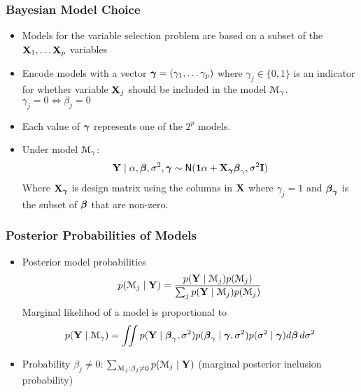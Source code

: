 \documentclass{beamer}\usepackage[]{graphicx}\usepackage[]{color}
\begin{document}
\begin{frame}\frametitle{Bayesian Model Choice}
  \begin{itemize}
  \item
Models for the variable selection problem  are based on a subset of
  the $\mathbf{X}_1, \ldots \mathbf{X}_p$ variables  \pause

\item Encode models with a  vector $\boldsymbol{\gamma} = (\gamma_1, \ldots
  \gamma_p)$  where  $\gamma_j \in \{0,1\}$
  is an indicator for whether variable $\mathbf{X}_j$ should be included in
  the model ${\cal M}_\gamma$.  $\gamma_j = 0 \Leftrightarrow \beta_j
  = 0$  \pause
\item Each value of $\boldsymbol{\gamma}$ represents one of the $2^p$ models.
\pause
\item Under model ${\cal M}_\gamma$:
 $$\mathbf{Y} \mid \alpha, \boldsymbol{\beta}, \sigma^2, \boldsymbol{\gamma} \sim \textsf{N}(\mathbf{1} \alpha + \mathbf{X}_{\boldsymbol{\gamma}} \boldsymbol{\beta}_\gamma,
 \sigma^2 \mathbf{I}) $$
Where $\mathbf{X}_{\boldsymbol{\gamma}}$ is design matrix  using the columns in $\mathbf{X}$ where
 $\gamma_j = 1$ and $\boldsymbol{\beta}_{\boldsymbol{\gamma}}$ is the subset of $\boldsymbol{\beta}$ that are non-zero.

\end{itemize}

\end{frame}


\begin{frame}\frametitle{Posterior Probabilities of Models}

  \begin{itemize}
  \item Posterior model probabilities
$$p({{\cal M}}_j \mid \mathbf{Y}) = \frac{ p(\mathbf{Y} \mid {{\cal M}}_j)p({{\cal M}}_j)}{\sum_jp(\mathbf{Y} \mid
  {{\cal M}}_j)p({{\cal M}}_j)} $$ \pause
Marginal likelihod of a model is proportional to
$$ p(\mathbf{Y} \mid {\cal M}_\gamma) = \iint p(\mathbf{Y} \mid \boldsymbol{\beta}_\gamma,
  \sigma^2)p(\boldsymbol{\beta}_\gamma \mid \boldsymbol{\gamma}, \sigma^2)p(\sigma^2 \mid \boldsymbol{\gamma})
  d\boldsymbol{\beta}\, d\sigma^2$$\pause
  \item Probability $\beta_j \ne 0$: $\sum_{{{\cal M}}_j:  \beta_j \ne 0}
    p({{\cal M}}_j \mid \mathbf{Y})$ (marginal posterior inclusion probability) \pause
  \end{itemize}
\end{frame}
\end{document}
